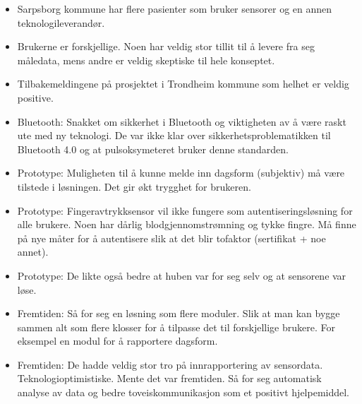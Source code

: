 \begin{itemize}
  \begin{itemize}
  \tightlist
  \item
    Sarpsborg kommune har flere pasienter som bruker sensorer og en
    annen teknologileverandør.
  \item
    Brukerne er forskjellige. Noen har veldig stor tillit til å levere
    fra seg måledata, mens andre er veldig skeptiske til hele konseptet.
  \item
    Tilbakemeldingene på prosjektet i Trondheim kommune som helhet er
    veldig positive.
  \item
    Bluetooth: Snakket om sikkerhet i Bluetooth og viktigheten av å være
    raskt ute med ny teknologi. De var ikke klar over
    sikkerhetsproblematikken til Bluetooth 4.0 og at pulsoksymeteret
    bruker denne standarden.
  \item
    Prototype: Muligheten til å kunne melde inn dagsform (subjektiv) må
    være tilstede i løsningen. Det gir økt trygghet for brukeren.
  \item
    Prototype: Fingeravtrykksensor vil ikke fungere som
    autentiseringsløsning for alle brukere. Noen har dårlig
    blodgjennomstrømning og tykke fingre. Må finne på nye måter for å
    autentisere slik at det blir tofaktor (sertifikat + noe annet).
  \item
    Prototype: De likte også bedre at huben var for seg selv og at
    sensorene var løse.
  \item
    Fremtiden: Så for seg en løsning som flere moduler. Slik at man kan bygge
    sammen alt som flere klosser for å tilpasse det til forskjellige
    brukere. For eksempel en modul for å rapportere dagsform.
  \item
    Fremtiden: De hadde veldig stor tro på innrapportering av sensordata.
    Teknologioptimistiske. Mente det var fremtiden. Så for seg
    automatisk analyse av data og bedre toveiskommunikasjon som et
    positivt hjelpemiddel.
  \end{itemize}
\end{itemize}
\fi
